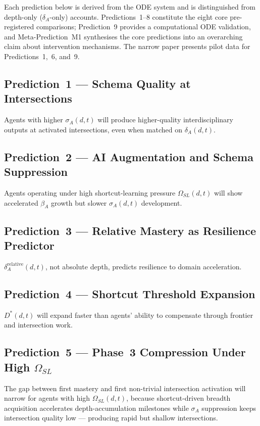 \documentclass[11pt]{article}
\theoremstyle{definition}
\theoremstyle{plain}
\begin{document}
Each prediction below is derived from the ODE system and is distinguished from depth-only ($\delta_A$-only) accounts. Predictions~1--8 constitute the eight core pre-registered comparisons; Prediction~9 provides a computational ODE validation, and Meta-Prediction~M1 synthesises the core predictions into an overarching claim about intervention mechanisms. The narrow paper presents pilot data for Predictions~1,~6, and~9.

\subsection{Prediction~1 --- Schema Quality at Intersections}
Agents with higher $\sigma_A(d,t)$ will produce higher-quality
interdisciplinary outputs at activated intersections, even when matched
on $\delta_A(d,t)$.

\subsection{Prediction~2 --- AI Augmentation and Schema Suppression}
Agents operating under high shortcut-learning pressure $\Omega_{SL}(d,t)$ will show accelerated $\beta_A$
growth but slower $\sigma_A(d,t)$ development.

\subsection{Prediction~3 --- Relative Mastery as Resilience Predictor}
$\delta_A^{\text{relative}}(d,t)$, not absolute depth, predicts
resilience to domain acceleration.

\subsection{Prediction~4 --- Shortcut Threshold Expansion}
$D^*(d,t)$ will expand faster than agents' ability to compensate through
frontier and intersection work.

\subsection{Prediction~5 --- Phase~3 Compression Under High \texorpdfstring{$\Omega_{SL}$}{Omega\_SL}}
The gap between first mastery and first non-trivial intersection
activation will narrow for agents with high $\Omega_{SL}(d,t)$, because shortcut-driven breadth acquisition accelerates depth-accumulation milestones while $\sigma_A$ suppression keeps intersection quality low --- producing rapid but shallow intersections.
\end{document}
